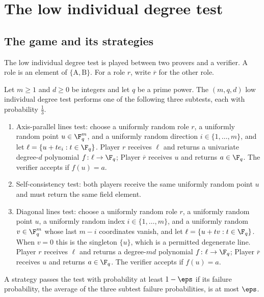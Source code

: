 \chapter{The low individual degree test}
\label{chap:test}
\label{sec:the-test}

\section{The game and its strategies}

\begin{definition}[Roles]\label{def:roles}
	\leanok
	The low individual degree test is played between two provers and a
	verifier.  A role is an element of $\{\mathrm A,\mathrm B\}$.  For a role
	$r$, write $\overline r$ for the other role.
\end{definition}

\begin{definition}\label{def:low-individual-degree-test}
	\leanok
	Let $m\ge1$ and $d\ge0$ be integers and let $q$ be a prime power.  The
	$(m,q,d)$ low individual degree test performs one of the following three
	subtests, each with probability $\frac13$.
	\begin{enumerate}
		\item Axis-parallel lines test: choose a uniformly random role $r$, a
		      uniformly random point $u\in\F_q^m$, and a uniformly random
		      direction $i\in\{1,\ldots,m\}$, and let
		      $\ell=\{u+te_i:t\in\F_q\}$.  Player $r$ receives $\ell$ and
		      returns a univariate degree-$d$ polynomial $f\colon\ell\to\F_q$;
		      Player $\overline r$ receives $u$ and returns $a\in\F_q$.  The
		      verifier accepts if $f(u)=a$.
		\item Self-consistency test: both players receive the same uniformly
		      random point $u$ and must return the same field element.
		\item Diagonal lines test: choose a uniformly random role $r$, a
		      uniformly random point $u$, a uniformly random index
		      $i\in\{1,\ldots,m\}$, and a uniformly random $v\in\F_q^m$ whose last
		      $m-i$ coordinates vanish, and let $\ell=\{u+tv:t\in\F_q\}$.  When
		      $v=0$ this is the singleton $\{u\}$, which is a permitted
		      degenerate line.  Player $r$ receives $\ell$ and returns a
		      degree-$md$ polynomial $f\colon\ell\to\F_q$; Player $\overline r$
		      receives $u$ and returns $a\in\F_q$.  The verifier accepts if
		      $f(u)=a$.
	\end{enumerate}
	A strategy passes the test with probability at least $1-\eps$ if its
	failure probability, the average of the three subtest failure
	probabilities, is at most $\eps$.
\end{definition}

